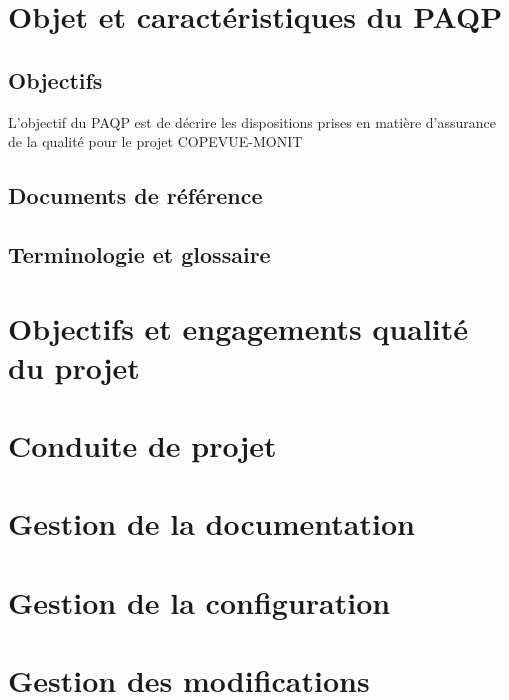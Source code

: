 \documentclass{mise_en_page}
\begin{document}
\maketitle

\begin{historique}
\end{historique}

\newpage

\tableofcontents

\section{Objet et caractéristiques du PAQP}

\subsection{Objectifs}
L’objectif du PAQP est de décrire les dispositions prises en matière d’assurance de la qualité pour le projet COPEVUE-MONIT

\subsection{Documents de référence}

\subsection{Terminologie et glossaire}

\section{Objectifs et engagements qualité du projet}

\section{Conduite de projet}

\section{Gestion de la documentation}

\section{Gestion de la configuration}

\section{Gestion des modifications}
\end{document}
